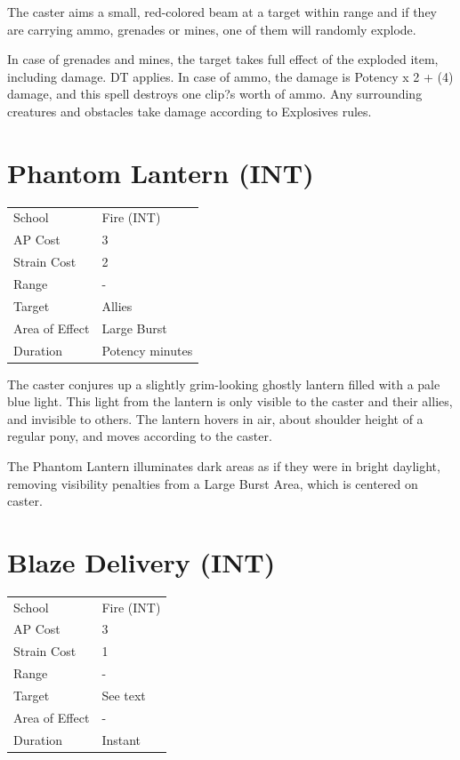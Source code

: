 \documentclass[11pt,a4paper,twocolumn]{book}
\begin{document}
	\medskip
	
	The caster aims a small, red-colored beam at a target within range and if they are carrying ammo, grenades or mines, one of them will randomly explode.
	
	In case of grenades and mines, the target takes full effect of the exploded item, including damage. DT applies. In case of ammo, the damage is Potency x 2 + (4) damage, and this spell destroys one clip?s worth of ammo. Any surrounding creatures and obstacles take damage according to Explosives rules.
	
	\section*{Phantom Lantern (INT)}
	{
		\begin{tabu} to 75mm{| X[l,4] | X[l,7] |}
			\hline
			School 			&  Fire (INT)			\\
			AP Cost	      	&  3					\\
			Strain Cost     &  2					\\
			Range     		&  -					\\
			Target      	&  Allies				\\
			Area of Effect  &  Large Burst	 		\\
			Duration     	&  Potency minutes		\\ \hline
		\end{tabu}
		
	}
	
	\medskip
	
	The caster conjures up a slightly grim-looking ghostly lantern filled with a pale blue light. This light from the lantern is only visible to the caster and their allies, and invisible to others. The lantern hovers in air, about shoulder height of a regular pony, and moves according to the caster.
	
	The Phantom Lantern illuminates dark areas as if they were in bright daylight, removing visibility penalties from a Large Burst Area, which is centered on caster.
	
		\section*{Blaze Delivery (INT)}
	{
		\begin{tabu} to 75mm{| X[l,4] | X[l,7] |}
			\hline
			School 			&  Fire (INT)			\\
			AP Cost	      	&  3					\\
			Strain Cost     &  1					\\
			Range     		&  -					\\
			Target      	&  See text				\\
			Area of Effect  &  -	 				\\
			Duration     	&  Instant				\\ \hline
		\end{tabu}
		
	}
	
\end{document}
